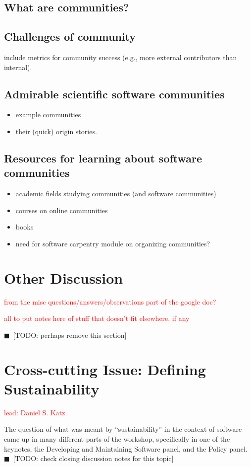 \documentclass[11pt, oneside]{amsart}
\newcommand{\todo}[1]{{\color{blue}$\blacksquare$~\textsf{[TODO: #1]}}}
\newcommand{\note}[1]{ {\textcolor{red}    { #1 }}}
\begin{document}
\subsection{What are communities?}
\subsection{Challenges of community}
include metrics for community success (e.g., more external
contributors than internal).
\subsection{Admirable scientific software communities}
\begin{itemize}
\item example communities
\item their (quick) origin stories.
\end{itemize}
\subsection{Resources for learning about software communities}
\begin{itemize}
\item academic fields studying communities (and software communities)
\item courses on online communities
\item books
\item need for software carpentry module on organizing communities?
\end{itemize}

\section{Other Discussion} \label{sec:other}

\note{from the misc questions/answers/observations part of the google doc?}

\note{all to put notes here of stuff that doesn't fit elsewhere, if any}

\todo{perhaps remove this section}


\section{Cross-cutting Issue: Defining Sustainability}  \label{sec:cross-cutting}

\note{lead: Daniel S. Katz}

The question of what was meant by ``sustainability'' in the context of software
came up in many different parts of the workshop, specifically in one of the
keynotes, the Developing and Maintaining Software panel, and the Policy panel. \todo{check closing discussion notes for this topic}
\end{document}
